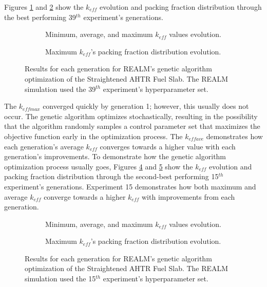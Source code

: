 Figures \ref{fig:keff_conv_39} and \ref{fig:pf_39} show the $k_{eff}$ evolution
and packing fraction distribution through the best performing 39$^{th}$ 
experiment's generations.
\begin{figure}[]
    \centering
    \begin{subfigure}{\textwidth}
    \caption{Minimum, average, and maximum $k_{eff}$ values evolution.}
    \label{fig:keff_conv_39}
    \end{subfigure}
    \begin{subfigure}{\textwidth}
        \caption{Maximum $k_{eff}$'s packing fraction distribution evolution.}
        \label{fig:pf_39}
    \end{subfigure}
    \caption{ Results for each generation for \gls{REALM}'s genetic algorithm optimization 
    of the Straightened \acrfull{AHTR} Fuel Slab. The \gls{REALM} simulation used 
    the 39$^{th}$ experiment's hyperparameter set.}
    \label{fig:39}
\end{figure}
The $k_{eff max}$ converged quickly by generation 1; however, this usually 
does not occur. 
The genetic algorithm optimizes stochastically, resulting in the possibility 
that the algorithm randomly samples a control parameter set that maximizes 
the objective function early in the optimization process. 
The $k_{eff ave}$ demonstrates how each generation's average $k_{eff}$
converges towards a higher value with each generation's improvements.
To demonstrate how the genetic algorithm optimization process usually goes, 
Figures \ref{fig:keff_conv_15} and \ref{fig:pf_15} show the $k_{eff}$ evolution 
and packing fraction distribution through the second-best performing 15$^{th}$ 
experiment's generations.  
Experiment 15 demonstrates how both maximum and average $k_{eff}$ converge
towards a higher $k_{eff}$ with improvements from each generation.
\begin{figure}[]
    \centering
    \begin{subfigure}{\textwidth}
    \caption{Minimum, average, and maximum $k_{eff}$ values evolution.}
    \label{fig:keff_conv_15}
    \end{subfigure}
    \begin{subfigure}{\textwidth}
        \caption{Maximum $k_{eff}$'s packing fraction distribution evolution.}
        \label{fig:pf_15}
    \end{subfigure}
    \caption{ Results for each generation for \gls{REALM}'s genetic algorithm optimization 
    of the Straightened \acrfull{AHTR} Fuel Slab. The \gls{REALM} simulation used 
    the 15$^{th}$ experiment's hyperparameter set.}
    \label{fig:15}
\end{figure}

